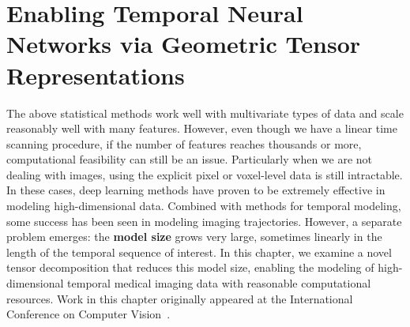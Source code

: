 \chapter{Enabling Temporal Neural Networks via Geometric Tensor Representations} \label{chap:ott} 

The above statistical methods work well with
multivariate types of data and scale reasonably well with many features.
However,
even though we have a linear time scanning procedure,
if the number of features reaches thousands or more,
computational feasibility can still be an issue.
Particularly when we are not dealing with
images,
using the explicit pixel or voxel-level
data is still intractable.
In these cases,
deep learning methods have
proven to be extremely effective
in modeling high-dimensional data.
Combined with methods
for temporal modeling,
some success has been seen
in modeling imaging trajectories.
However, a separate problem
emerges: the \textbf{model size}
grows very large, sometimes linearly 
in the length of the temporal sequence of interest.
In this chapter, we examine
a novel tensor decomposition
that reduces this model size,
enabling the modeling of high-dimensional
temporal medical imaging data
with reasonable computational resources.
Work in this chapter originally appeared at
the International Conference on Computer Vision~\citep{ott}.



%



